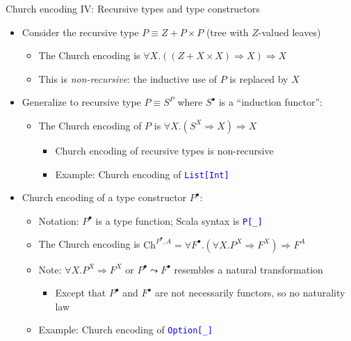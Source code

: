 \documentclass[english,,russian]{beamer}
\begin{document}
\begin{frame}{Church encoding IV: Recursive types and type constructors}
\begin{itemize}
\item Consider the recursive type {\footnotesize{}$P\equiv Z+P\times P$}
(tree with $Z$-valued leaves)
\begin{itemize}
\item The Church encoding is {\footnotesize{}$\forall X.\left(\left(Z+X\times X\right)\Rightarrow X\right)\Rightarrow X$}{\footnotesize\par}
\item This is \emph{non-recursive}: the inductive use of $P$ is replaced
by $X$
\end{itemize}
\item Generalize to recursive type $P\equiv S^{P}$ where $S^{\bullet}$
is a ``induction functor'':
\begin{itemize}
\item The Church encoding of $P$ is {\footnotesize{}$\forall X.\left(S^{X}\Rightarrow X\right)\Rightarrow X$}{\footnotesize\par}
\begin{itemize}
\item Church encoding of recursive types is non-recursive
\item Example: Church encoding of \texttt{\textcolor{blue}{\footnotesize{}List{[}Int{]}}} 
\end{itemize}
\end{itemize}
\item Church encoding of a type constructor $P^{\bullet}$:
\begin{itemize}
\item Notation: $P^{\bullet}$ is a type function; Scala syntax is \texttt{\textcolor{blue}{\footnotesize{}P{[}\_{]}}} 
\item The Church encoding is {\footnotesize{}$\text{Ch}^{P^{\bullet},A}=\forall F^{\bullet}.\left(\forall X.P^{X}\Rightarrow F^{X}\right)\Rightarrow F^{A}$}{\footnotesize\par}
\item Note: $\forall X.P^{X}\Rightarrow F^{X}$ or $P^{\bullet}\leadsto F^{\bullet}$
resembles a natural transformation
\begin{itemize}
\item Except that $P^{\bullet}$ and $F^{\bullet}$ are not necessarily
functors, so no naturality law
\end{itemize}
\item Example: Church encoding of \texttt{\textcolor{blue}{\footnotesize{}Option{[}\_{]}}} 

\end{itemize}
\end{itemize}
\end{frame}
\end{document}
